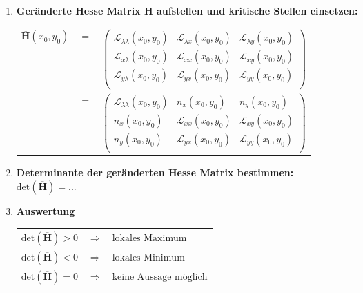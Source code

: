 \begin{enumerate}[itemsep=1ex]
    \item \textbf{Geränderte Hesse Matrix $\overline{\mathbf{H}}$ aufstellen und kritische Stellen einsetzen:}\\
    
    \begin{tabular}{lll}
        $\overline{\mathbf{H}}(x_0,y_0)$ &$=$&
        $\left(
            \begin{matrix}
                {{\mathcal{L}_{\lambda\lambda}(x_0, y_0)}}&{{\mathcal{L}_{\lambda x}(x_0, y_0)}}&{{\mathcal{L}_{\lambda y}(x_0, y_0)}}\\
                {{\mathcal{L}_{x\lambda}(x_0, y_0)}}&{{\mathcal{L}_{xx}(x_0, y_0)}}&{{\mathcal{L}_{xy}(x_0, y_0)}}\\
                {{\mathcal{L}_{y\lambda}(x_0, y_0)}}&{{\mathcal{L}_{yx}(x_0, y_0)}}&{{\mathcal{L}_{yy}(x_0, y_0)}}\\
            \end{matrix}
        \right)$\\
        &$=$&
        $\left(
            \begin{matrix}
                {{\mathcal{L}_{\lambda\lambda}(x_0, y_0)}}&{{n_{x}(x_0, y_0)}}&{{n_{y}(x_0, y_0)}}\\
                {{n_{x}(x_0, y_0)}}&{{\mathcal{L}_{xx}(x_0, y_0)}}&{{\mathcal{L}_{xy}(x_0, y_0)}}\\
                {{n_{y}(x_0, y_0)}}&{{\mathcal{L}_{yx}(x_0, y_0)}}&{{\mathcal{L}_{yy}(x_0, y_0)}}\\
            \end{matrix}
        \right)$
        
    \end{tabular}


    \item \textbf{Determinante der geränderten Hesse Matrix bestimmen:}\\
    $\text{det}\left(\overline{\mathbf{H}}\right) = ... $

    \item \textbf{Auswertung}\\
    \begin{tabular}{lll}
        \hline
        $\text{det}\left(\overline{\mathbf{H}}\right) > 0$ &$\Longrightarrow$& $\text{lokales Maximum}$\\
        \hline
        $\text{det}\left(\overline{\mathbf{H}}\right) < 0$ &$\Longrightarrow$& $\text{lokales Minimum}$\\
        \hline
        $\text{det}\left(\overline{\mathbf{H}}\right) = 0$ &$\Longrightarrow$& $\text{keine Aussage möglich}$\\
        \hline
    \end{tabular}

\end{enumerate}

